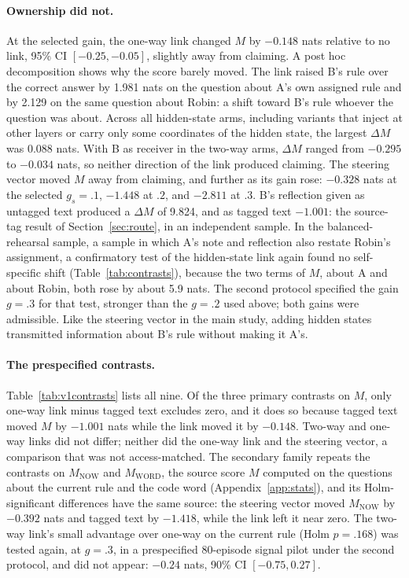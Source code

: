 \paragraph{Ownership did not.}
At the selected gain, the one-way link changed $M$ by $-0.148$ nats
relative to no link, 95\% CI $[-0.25,-0.05]$, slightly away from
claiming. A post hoc decomposition shows why the score barely moved.
The link raised B's rule over the correct answer by 1.981 nats on
the question about A's own assigned rule and by 2.129 on the same
question about Robin: a shift toward B's rule whoever the question
was about. Across all hidden-state arms, including variants that inject
at other layers or carry only some coordinates of the hidden state, the
largest $\Delta M$ was 0.088 nats. With B as receiver in the two-way
arms, $\Delta M$ ranged from $-0.295$ to $-0.034$ nats, so neither
direction of the link produced claiming. The steering vector moved $M$
away from claiming, and further as its gain rose: $-0.328$ nats at the
selected $g_s=.1$, $-1.448$ at $.2$, and $-2.811$ at $.3$. B's
reflection given as untagged text produced a $\Delta M$ of 9.824, and as
tagged text $-1.001$: the source-tag result of Section~\ref{sec:route},
in an independent sample. In the balanced-rehearsal sample, a sample in
which A's note and reflection also restate Robin's assignment, a
confirmatory test of the hidden-state link again found no self-specific
shift (Table~\ref{tab:contrasts}), because the two terms of $M$, about A
and about Robin, both rose by about 5.9 nats. The second protocol
specified the gain $g=.3$ for that test, stronger than the $g=.2$ used
above; both gains were admissible. Like the steering vector in the main
study, adding hidden states transmitted information about B's rule
without making it A's.

\paragraph{The prespecified contrasts.}
Table~\ref{tab:v1contrasts} lists all nine. Of the three primary
contrasts on $M$, only one-way link minus tagged text excludes zero, and
it does so because tagged text moved $M$ by $-1.001$ nats while the link
moved it by $-0.148$. Two-way and one-way links did not differ; neither
did the one-way link and the steering vector, a comparison that was not
access-matched. The secondary family repeats the contrasts on
$M_{\mathrm{NOW}}$ and $M_{\mathrm{WORD}}$, the source score $M$
computed on the questions about the current rule and the code word
(Appendix~\ref{app:stats}), and its Holm-significant differences have
the same source: the steering vector moved $M_{\mathrm{NOW}}$ by
$-0.392$ nats and tagged text by $-1.418$, while the link left it near
zero. The two-way link's small advantage
over one-way on the current rule (Holm $p=.168$) was tested again, at
$g=.3$, in a prespecified 80-episode signal pilot under the second
protocol, and did not appear: $-0.24$ nats, 90\% CI $[-0.75,0.27]$.

